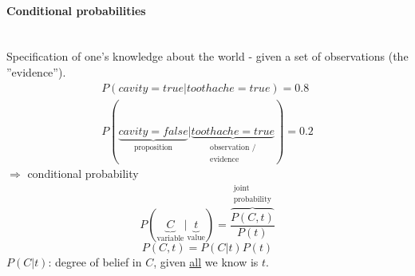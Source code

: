 \paragraph{Conditional probabilities}\mbox{}\\
Specification of one's knowledge about the world - given a set of observations (the ''evidence'').
\[ \begin{array}{l}
	P(cavity = true | toothache = true) = 0.8 \\
	P( \underbrace{cavity = false}_{ \text{proposition} }
	| \underbrace{ toothache = true}_{\substack{\text{observation /} \\
						\text{evidence}}}
	) = 0.2
\end{array} \]
$\Rightarrow$ conditional probability
\begin{equation}
	P( \underbrace{C}_{\text{variable}} | \underbrace{t}_{\text{value}} 
		) = \frac{ \overbrace{P(C,t)}^{\substack{\text{joint} \\
						\text{probability}}} }{
				P(t)}
\end{equation}
\begin{equation} \tag{product rule}
	P(C,t) = P(C|t) P(t)
\end{equation}
$P(C|t)$: degree of belief in $C$, given \underline{all} we know is $t$.


